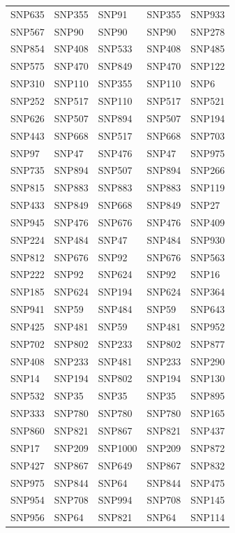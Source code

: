 \begin{table}[ht]
\begin{tabular}{lllll}
  SNP635 & SNP355 & SNP91 & SNP355 & SNP933 \\ 
  SNP567 & SNP90 & SNP90 & SNP90 & SNP278 \\ 
  SNP854 & SNP408 & SNP533 & SNP408 & SNP485 \\ 
  SNP575 & SNP470 & SNP849 & SNP470 & SNP122 \\ 
  SNP310 & SNP110 & SNP355 & SNP110 & SNP6 \\ 
  SNP252 & SNP517 & SNP110 & SNP517 & SNP521 \\ 
  SNP626 & SNP507 & SNP894 & SNP507 & SNP194 \\ 
  SNP443 & SNP668 & SNP517 & SNP668 & SNP703 \\ 
  SNP97 & SNP47 & SNP476 & SNP47 & SNP975 \\ 
  SNP735 & SNP894 & SNP507 & SNP894 & SNP266 \\ 
  SNP815 & SNP883 & SNP883 & SNP883 & SNP119 \\ 
  SNP433 & SNP849 & SNP668 & SNP849 & SNP27 \\ 
  SNP945 & SNP476 & SNP676 & SNP476 & SNP409 \\ 
  SNP224 & SNP484 & SNP47 & SNP484 & SNP930 \\ 
  SNP812 & SNP676 & SNP92 & SNP676 & SNP563 \\ 
  SNP222 & SNP92 & SNP624 & SNP92 & SNP16 \\ 
  SNP185 & SNP624 & SNP194 & SNP624 & SNP364 \\ 
  SNP941 & SNP59 & SNP484 & SNP59 & SNP643 \\ 
  SNP425 & SNP481 & SNP59 & SNP481 & SNP952 \\ 
  SNP702 & SNP802 & SNP233 & SNP802 & SNP877 \\ 
  SNP408 & SNP233 & SNP481 & SNP233 & SNP290 \\ 
  SNP14 & SNP194 & SNP802 & SNP194 & SNP130 \\ 
  SNP532 & SNP35 & SNP35 & SNP35 & SNP895 \\ 
  SNP333 & SNP780 & SNP780 & SNP780 & SNP165 \\ 
  SNP860 & SNP821 & SNP867 & SNP821 & SNP437 \\ 
  SNP17 & SNP209 & SNP1000 & SNP209 & SNP872 \\ 
  SNP427 & SNP867 & SNP649 & SNP867 & SNP832 \\ 
  SNP975 & SNP844 & SNP64 & SNP844 & SNP475 \\ 
  SNP954 & SNP708 & SNP994 & SNP708 & SNP145 \\ 
  SNP956 & SNP64 & SNP821 & SNP64 & SNP114 \\ 

\end{tabular}
\end{table}
